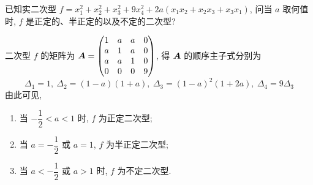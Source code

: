 \begin{example}[2005 武汉大学]
    已知实二次型 $f=x_1^2+x_2^2+x_3^2+9x_4^2+2a(x_1x_2+x_2x_3+x_3x_1)$, 问当 $a$ 取何值时, $f$ 是正定的、半正定的以及不定的二次型?
\end{example}
\begin{solution}
    二次型 $f$ 的矩阵为 $\vb*{A}=\begin{pmatrix}
            1 & a & a & 0 \\
            a & 1 & a & 0 \\
            a & a & 1 & 0 \\
            0 & 0 & 0 & 9
        \end{pmatrix}$, 得 $\vb*{A}$ 的顺序主子式分别为
    $$\varDelta_1=1,~\varDelta_2=(1-a)(1+a),~\varDelta_3=(1-a)^2(1+2a),~\varDelta_4=9\varDelta_3$$
    由此可见, \begin{enumerate}[label=(\arabic{*})]
        \item 当 $-\dfrac{1}{2}<a<1$ 时, $f$ 为正定二次型;
        \item 当 $a=-\dfrac{1}{2}$ 或 $a=1$, $f$ 为半正定二次型;
        \item 当 $a<-\dfrac{1}{2}$ 或 $a>1$ 时, $f$ 为不定二次型.
    \end{enumerate}
\end{solution}

